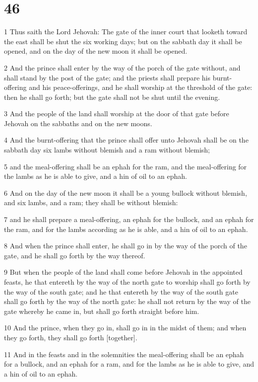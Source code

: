 \chapter{46}

\par 1 Thus saith the Lord Jehovah: The gate of the inner court that looketh toward the east shall be shut the six working days; but on the sabbath day it shall be opened, and on the day of the new moon it shall be opened.
\par 2 And the prince shall enter by the way of the porch of the gate without, and shall stand by the post of the gate; and the priests shall prepare his burnt-offering and his peace-offerings, and he shall worship at the threshold of the gate: then he shall go forth; but the gate shall not be shut until the evening.
\par 3 And the people of the land shall worship at the door of that gate before Jehovah on the sabbaths and on the new moons.
\par 4 And the burnt-offering that the prince shall offer unto Jehovah shall be on the sabbath day six lambs without blemish and a ram without blemish;
\par 5 and the meal-offering shall be an ephah for the ram, and the meal-offering for the lambs as he is able to give, and a hin of oil to an ephah.
\par 6 And on the day of the new moon it shall be a young bullock without blemish, and six lambs, and a ram; they shall be without blemish:
\par 7 and he shall prepare a meal-offering, an ephah for the bullock, and an ephah for the ram, and for the lambs according as he is able, and a hin of oil to an ephah.
\par 8 And when the prince shall enter, he shall go in by the way of the porch of the gate, and he shall go forth by the way thereof.
\par 9 But when the people of the land shall come before Jehovah in the appointed feasts, he that entereth by the way of the north gate to worship shall go forth by the way of the south gate; and he that entereth by the way of the south gate shall go forth by the way of the north gate: he shall not return by the way of the gate whereby he came in, but shall go forth straight before him.
\par 10 And the prince, when they go in, shall go in in the midst of them; and when they go forth, they shall go forth [together].
\par 11 And in the feasts and in the solemnities the meal-offering shall be an ephah for a bullock, and an ephah for a ram, and for the lambs as he is able to give, and a hin of oil to an ephah.
